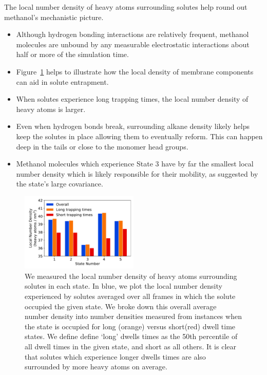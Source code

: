 \documentclass[journal=jpcbfk,manuscript=article]{achemso}
\begin{document}
  The local number density of heavy atoms surrounding solutes help round out methanol's
  mechanistic picture.
  \begin{itemize}
    \item Although hydrogen bonding interactions are relatively frequent, methanol molecules
    are unbound by any measurable electrostatic interactions about half or more of the 
    simulation time.  
    \item Figure~\ref{fig:local_densities} helps to illustrate how the local density of 
    membrane components can aid in solute entrapment.
    \item When solutes experience long trapping times, the local number density of heavy 
    atoms is larger.
    \item Even when hydrogen bonds break, surrounding alkane density likely helps keep
    the solutes in place allowing them to eventually reform. This can happen deep in the
    tails or close to the monomer head groups.
    \item Methanol molecules which experience State 3 have by far the smallest local 
    number density which is likely responsible for their mobility, as suggested by the state's
    large covariance.
  \end{itemize}
  
  \begin{figure}
  \centering
  \includegraphics[width=0.5\textwidth]{local_densities.pdf}
  \caption{We measured the local number density of heavy atoms surrounding solutes in each
  state. In blue, we plot the local number density experienced by solutes averaged over all
  frames in which the solute occupied the given state. We broke down this overall average 
  number density into number densities measured from instances when the state is occupied 
  for long (orange) versus short(red) dwell time states. We define define `long' dwells times
  as the 50th percentile of all dwell times in the given state, and short as all others. It
  is clear that solutes which experience longer dwells times are also surrounded by more 
  heavy atoms on average.}\label{fig:local_densities}
  \end{figure}
  
\end{document}
